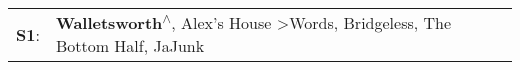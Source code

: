 \begin{supertabular}{p{0.03\textwidth}p{0.92\textwidth}}
 \textbf{S1}:  &  \textbf{Walletsworth\textsuperscript{$\wedge$}}, \enspace Alex's House\textsuperscript{} \textgreater \enspace Words\textsuperscript{}, \enspace Bridgeless\textsuperscript{}, \enspace The Bottom Half\textsuperscript{}, \enspace JaJunk\textsuperscript{}  \enspace  \\
\end{supertabular}
